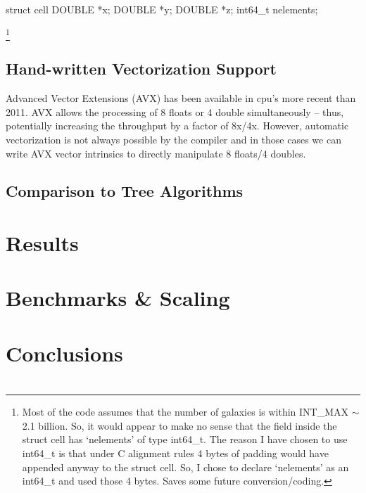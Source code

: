 \documentclass[apj]{emulateapj}
\begin{document}
\begin{code}
struct cell
{
  DOUBLE *x;
  DOUBLE *y;
  DOUBLE *z;
  int64_t nelements;
}
\end{code}\footnote{Most of the code assumes that the number of galaxies is within INT_MAX $\sim$ 2.1 billion. So, it would appear 
to make no sense that the field inside the struct cell has `nelements' of type int64_t. The reason I have 
chosen to use int64_t is that under C alignment rules 4 bytes of padding would have appended anyway to the struct cell. So, I chose 
to declare `nelements' as an int64_t and used those 4 bytes. Saves some future conversion/coding. }





\subsection{Hand-written Vectorization Support}
Advanced Vector Extensions (AVX) has been available in cpu's more recent than 2011. AVX allows the processing of 8 floats or 4 double simultaneously -- thus, 
potentially increasing the throughput by a factor of 8x/4x. However, automatic vectorization is not always possible by the compiler and in those cases 
we can write AVX vector intrinsics to directly manipulate 8 floats/4 doubles. 


\subsection{Comparison to Tree Algorithms}

\section{Results}

\section{Benchmarks \& Scaling}

\section{Conclusions}

\acknowledgements 


\section{}




\end{document}
